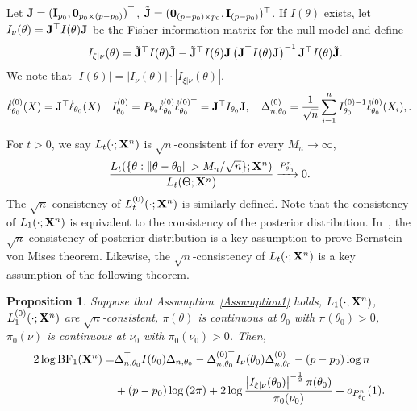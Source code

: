 \documentclass[11pt]{article}
\theoremstyle{plain}
\newtheorem{proposition}{\quad\quad Proposition}
\theoremstyle{definition}
\theoremstyle{remark}
\begin{document}
Let
$\mathbf{J}=(\mathbf{I}_{p_0},\mathbf{0}_{p_0\times(p-p_0)})^\top $,
$\tilde{\mathbf{J}}=(\mathbf {0}_{ (p- p_0) \times p_0 },\mathbf{I}_{(p-p_0)})^\top $.
If $I(\theta)$ exists, let $I_{\nu}(\theta)=\mathbf{J}^\top I(\theta) \mathbf{J}$ be the Fisher information matrix for the null model and define
\begin{align*}
    \quad
    I_{\xi|\nu}(\theta) = 
    \tilde {\mathbf{J}} ^\top  I(\theta) \tilde {\mathbf{J}}
    -
    \tilde {\mathbf{J}} ^\top  I(\theta) \mathbf{J}
    \left(  \mathbf{J} ^\top  I(\theta) \mathbf{J} \right)^{-1}
    \mathbf{J} ^\top  I(\theta) \tilde {\mathbf{J}}
    .
\end{align*}
We note that $|I(\theta)| = |I_{\nu}(\theta)|\cdot |I_{\xi | \nu}(\theta )|$.
$$
\dot{\ell}_{\theta_0}^{(0)}(X)= \mathbf{J}^\top \dot \ell_{\theta_0}(X)
\quad 
I^{(0)}_{\theta_0}=P_{\theta_0}\dot{\ell}_{\theta_0}^{(0)}\dot{\ell}_{\theta_0}^{(0)\top}=\mathbf{J}^\top I_{\theta_0} \mathbf{J},\quad 
\Delta_{n,\theta_0}^{(0)}
=\frac{1}{\sqrt{n}}\sum_{i=1}^n I_{\theta_0}^{(0)-1}\dot{\ell}^{(0)}_{\theta_0}(X_i),
.
$$


For $t>0$, we say $L_t(\cdot;\mathbf{X}^{n})$ is $\sqrt{n}$-consistent if for every $M_n\to \infty$,
    $$
    \frac{L_t({\{\theta:\|\theta-\theta_0\|> M_n/\sqrt{n}\}};\BX^{n})}{L_t(\Theta;\BX^{n})}\xrightarrow{P_{\theta_0}^n} 0.
    $$
    The $\sqrt{n}$-consistency of $L_t^{(0)}(\cdot;\mathbf{X}^{n})$ is similarly defined.
    Note that the consistency of $L_1(\cdot;\mathbf{X}^{n})$ is equivalent to the consistency of the posterior distribution.
    In~\cite{Kleijn2012The}, the $\sqrt{n}$-consistency of posterior distribution is a key assumption to prove Bernstein-von Mises theorem.
    Likewise, the $\sqrt{n}$-consistency of $L_t(\cdot;\mathbf{X}^{n})$ is a key assumption of the following theorem.

    \begin{proposition}
        Suppose that Assumption~\ref{Assumption1} holds, $L_{1}(\cdot;\mathbf{X}^{n})$, $L_{1}^{(0)}(\cdot;\mathbf{X}^{n})$ are $\sqrt{n}$-consistent, $\pi(\theta)$ is continuous at $\theta_0$ with $\pi(\theta_0)>0$, $\pi_0(\nu)$ is continuous at $\nu_0$ with $\pi_0(\nu_0)>0$.
        Then,
\begin{align*}
    2 \log \text{BF}_1 (\mathbf{X}^{n})
    =&
        \Delta_{n,\theta_0}^\top  I(\theta_0)\Delta_{n,\theta_0}
            -
            \Delta_{n,\theta_0}^{{(0)}\top} I_{\nu}(\theta_0)\Delta^{(0)}_{n,\theta_0}
    -(p-p_0) \log n
    \\
    &+
    (p-p_0) \log \left( {2\pi} \right)
   +
   2 \log
       \frac{
           \left|I_{\xi|\nu}(\theta_0)\right|^{-\frac 1 2}\pi(\theta_0) 
   }{
    \pi_0(\nu_0)
}
    +o_{P^n_{\theta_0}}(1)
    .
\end{align*}
\label{prop:expansion}
    \end{proposition}
\end{document}
